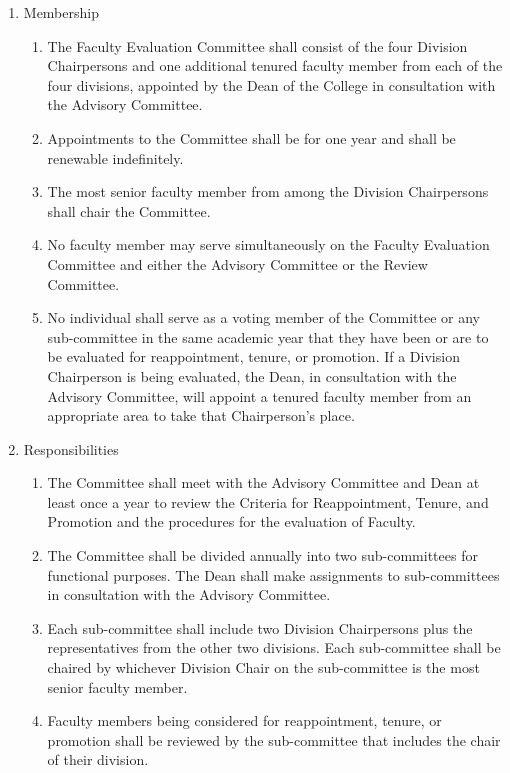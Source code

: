 \documentclass{manual}
\newcommand{\itemLevelA}{\alph*.}
\newcommand{\itemLevelB}{\arabic*)}
\newcommand{\itemRefA}{\alph*}
\newcommand{\itemRefB}{\arabic*}
\begin{document}
\begin{enumerate}[label=\itemLevelA,ref=\itemRefA]
\item Membership
\begin{enumerate}[label=\itemLevelB,ref=\itemRefB]
\item The Faculty Evaluation Committee shall consist of the four Division Chairpersons and one additional tenured faculty member from each of the four divisions, appointed by the Dean of the College in consultation with the Advisory Committee.
\item Appointments to the Committee shall be for one year and shall be renewable indefinitely.
\item The most senior faculty member from among the Division Chairpersons shall chair the Committee.
\item No faculty member may serve simultaneously on the Faculty Evaluation Committee and either the Advisory Committee or the Review Committee.
\item No individual shall serve as a voting member of the Committee or any sub-committee in the same academic year that they have  been or are to be evaluated for reappointment, tenure, or promotion. If a Division Chairperson is being evaluated, the Dean, in consultation with the Advisory Committee, will appoint a tenured faculty member from an appropriate area to take that Chairperson's place.
\end{enumerate}
\item Responsibilities
\begin{enumerate}[label=\itemLevelB,ref=\itemRefB]
\item The Committee shall meet with the Advisory Committee and Dean at least once a year to review the Criteria for Reappointment, Tenure, and Promotion and the procedures for the evaluation of Faculty.
\item The Committee shall be divided annually into two sub-committees for functional purposes. The Dean shall make assignments to sub-committees in consultation with the Advisory Committee.
\item Each sub-committee shall include two Division Chairpersons plus the representatives from the other two divisions. Each sub-committee shall be chaired by whichever Division Chair on the sub-committee is the most senior faculty member.
\item Faculty members being considered for reappointment, tenure, or promotion shall be reviewed by the sub-committee that includes the chair of their division.

\end{enumerate}
\end{enumerate}
\end{document}
